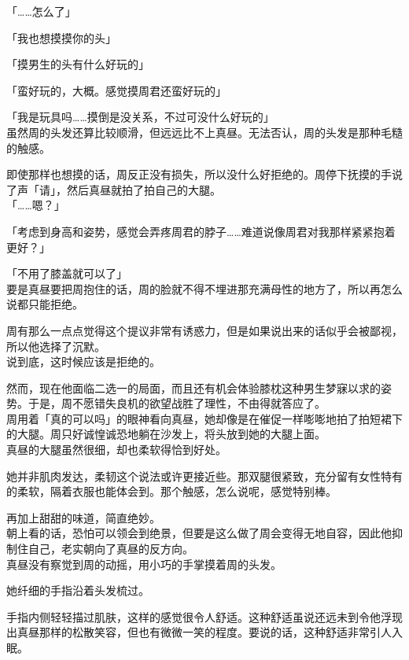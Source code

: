 「……怎么了」

「我也想摸摸你的头」

「摸男生的头有什么好玩的」

「蛮好玩的，大概。感觉摸周君还蛮好玩的」

「我是玩具吗……摸倒是没关系，不过可没什么好玩的」\\

虽然周的头发还算比较顺滑，但远远比不上真昼。无法否认，周的头发是那种毛糙的触感。

即使那样也想摸的话，周反正没有损失，所以没什么好拒绝的。周停下抚摸的手说了声「请」，然后真昼就拍了拍自己的大腿。\\

「……嗯？」

「考虑到身高和姿势，感觉会弄疼周君的脖子……难道说像周君对我那样紧紧抱着更好？」

「不用了膝盖就可以了」\\

要是真昼要把周抱住的话，周的脸就不得不埋进那充满母性的地方了，所以再怎么说都只能拒绝。

周有那么一点点觉得这个提议非常有诱惑力，但是如果说出来的话似乎会被鄙视，所以他选择了沉默。\\

说到底，这时候应该是拒绝的。

然而，现在他面临二选一的局面，而且还有机会体验膝枕这种男生梦寐以求的姿势。于是，周不愿错失良机的欲望战胜了理性，不由得就答应了。\\

周用着「真的可以吗」的眼神看向真昼，她却像是在催促一样嘭嘭地拍了拍短裙下的大腿。周只好诚惶诚恐地躺在沙发上，将头放到她的大腿上面。\\

真昼的大腿虽然很细，却也柔软得恰到好处。

她并非肌肉发达，柔韧这个说法或许更接近些。那双腿很紧致，充分留有女性特有的柔软，隔着衣服也能体会到。那个触感，怎么说呢，感觉特别棒。

再加上甜甜的味道，简直绝妙。\\

朝上看的话，恐怕可以领会到绝景，但要是这么做了周会变得无地自容，因此他抑制住自己，老实朝向了真昼的反方向。\\

真昼没有察觉到周的动摇，用小巧的手掌摸着周的头发。

她纤细的手指沿着头发梳过。

手指内侧轻轻描过肌肤，这样的感觉很令人舒适。这种舒适虽说还远未到令他浮现出真昼那样的松散笑容，但也有微微一笑的程度。要说的话，这种舒适非常引人入眠。\\

